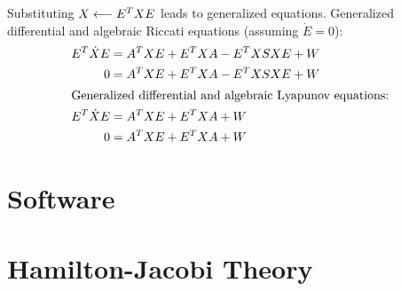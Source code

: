 Substituting $X\longleftarrow E^T XE$ leads to generalized equations.
Generalized differential and algebraic Riccati equations (assuming $\dot E = 0$):
\begin{align}
  E^T \dot{X}E &= A^T XE + E^T XA - E^T XSXE + W \\
  0 &= A^T XE + E^T XA - E^T XSXE + W \\
\intertext{Generalized differential and algebraic Lyapunov equations:}
  E^T \dot{X}E &= A^T XE + E^T XA + W \\
  0 &= A^T XE + E^T XA + W \\
\end{align}

\cite{Lang2017}

\section{Software}

\cite{DrWatson}

\section{Hamilton-Jacobi Theory}

